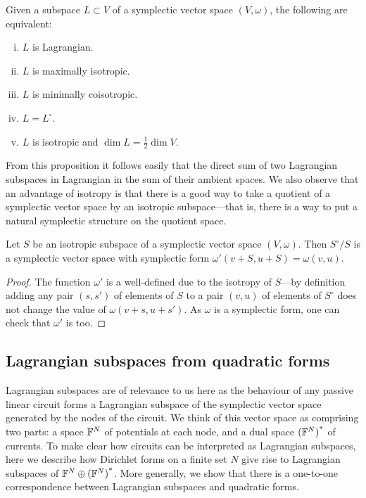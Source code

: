 \begin{proposition} \label{lagrangian_characterization} 
  Given a subspace $L \subset V$ of a symplectic vector space $(V,\omega)$, the
  following are equivalent: 
  \begin{enumerate}[(i)] 
    \item $L$ is Lagrangian.  
    \item $L$ is maximally isotropic.  
    \item $L$ is minimally coisotropic.  
    \item $L = L^\circ$.  
    \item $L$ is isotropic and $\dim L = \frac12 \dim V$.
  \end{enumerate} 
\end{proposition}

From this proposition it follows easily that the direct sum of two Lagrangian
subspaces in Lagrangian in the sum of their ambient spaces. We also observe that
an advantage of isotropy is that there is a good way to take a quotient of a
symplectic vector space by an isotropic subspace---that is, there is a way to
put a natural symplectic structure on the quotient space.

\begin{proposition}
  Let $S$ be an isotropic subspace of a symplectic vector space $(V,\omega)$.
  Then $S^\circ/S$ is a symplectic vector space with symplectic form
  $\omega'(v+S,u+S) = \omega(v,u)$.
\end{proposition}
\begin{proof} 
  The function $\omega'$ is a well-defined due to the isotropy of
  $S$---by definition adding any pair $(s,s')$ of elements of $S$ to a pair
  $(v,u)$ of elements of $S^\circ$ does not change the value of
  $\omega(v+s,u+s')$. As $\omega$ is a symplectic form, one can check that
  $\omega'$ is too.  
\end{proof}

\subsection{Lagrangian subspaces from quadratic forms}

Lagrangian subspaces are of relevance to us here as the behaviour of any passive
linear circuit forms a Lagrangian subspace of the symplectic vector space
generated by the nodes of the circuit. We think of this vector space as
comprising two parts: a space ${\mathbb F}^N$ of potentials at each node, and a dual
space ${({\mathbb F}^N)}^\ast$ of currents. To make clear how circuits can be interpreted
as Lagrangian subspaces, here we describe how Dirichlet forms on a finite set
$N$ give rise to Lagrangian subspaces of ${{\mathbb F}^{N} \oplus {({\mathbb F}^{N})}^\ast}$. More generally, we show
that there is a one-to-one correspondence between Lagrangian subspaces and
quadratic forms.

